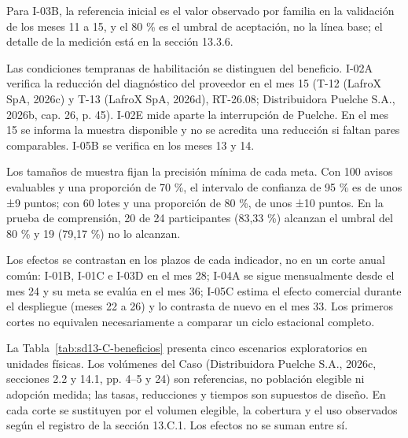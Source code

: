 Para I-03B, la referencia inicial es el valor observado por familia en la validación de los meses 11 a 15, y el 80 \% es el umbral de aceptación, no la línea base; el detalle de la medición está en la sección 13.3.6.

Las condiciones tempranas de habilitación se distinguen del beneficio. I-02A verifica la reducción del diagnóstico del proveedor en el mes 15 (T-12 (LafroX SpA, 2026c) y T-13 (LafroX SpA, 2026d), RT-26.08; Distribuidora Puelche S.A., 2026b, cap. 26, p. 45). I-02E mide aparte la interrupción de Puelche. En el mes 15 se informa la muestra disponible y no se acredita una reducción si faltan pares comparables. I-05B se verifica en los meses 13 y 14.

Los tamaños de muestra fijan la precisión mínima de cada meta. Con 100 avisos evaluables y una proporción de 70 \%, el intervalo de confianza de 95 \% es de unos ±9 puntos; con 60 lotes y una proporción de 80 \%, de unos ±10 puntos. En la prueba de comprensión, 20 de 24 participantes (83,33 \%) alcanzan el umbral del 80 \% y 19 (79,17 \%) no lo alcanzan.

Los efectos se contrastan en los plazos de cada indicador, no en un corte anual común: I-01B, I-01C e I-03D en el mes 28; I-04A se sigue mensualmente desde el mes 24 y su meta se evalúa en el mes 36; I-05C estima el efecto comercial durante el despliegue (meses 22 a 26) y lo contrasta de nuevo en el mes 33. Los primeros cortes no equivalen necesariamente a comparar un ciclo estacional completo.

La Tabla~\ref{tab:sd13-C-beneficios} presenta cinco escenarios exploratorios en unidades físicas. Los volúmenes del Caso (Distribuidora Puelche S.A., 2026c, secciones 2.2 y 14.1, pp. 4--5 y 24) son referencias, no población elegible ni adopción medida; las tasas, reducciones y tiempos son supuestos de diseño. En cada corte se sustituyen por el volumen elegible, la cobertura y el uso observados según el registro de la sección 13.C.1. Los efectos no se suman entre sí.

